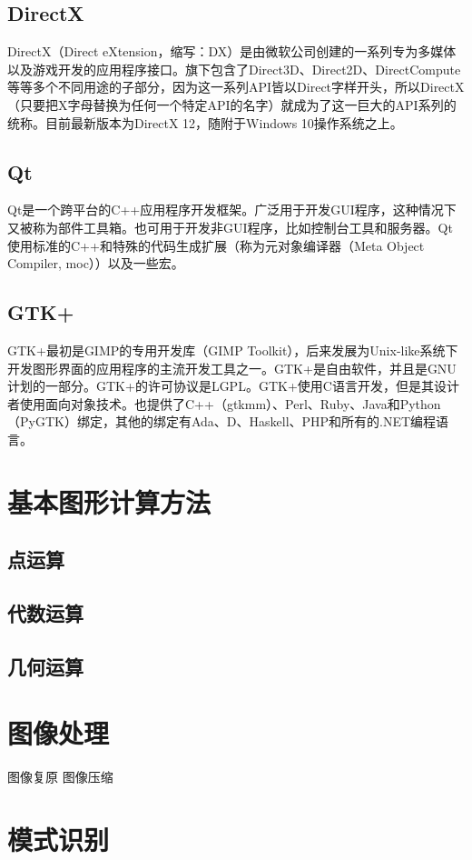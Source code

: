 \documentclass[UTF8]{article}
\begin{document}
\subsection{DirectX}
DirectX（Direct eXtension，缩写：DX）是由微软公司创建的一系列专为多媒体以及游戏开发的应用程序接口。旗下包含了Direct3D、Direct2D、DirectCompute等等多个不同用途的子部分，因为这一系列API皆以Direct字样开头，所以DirectX（只要把X字母替换为任何一个特定API的名字）就成为了这一巨大的API系列的统称。目前最新版本为DirectX 12，随附于Windows 10操作系统之上。

\subsection{Qt}
Qt是一个跨平台的C++应用程序开发框架。广泛用于开发GUI程序，这种情况下又被称为部件工具箱。也可用于开发非GUI程序，比如控制台工具和服务器。Qt使用标准的C++和特殊的代码生成扩展（称为元对象编译器（Meta Object Compiler, moc））以及一些宏。
\subsection{GTK+}
GTK+最初是GIMP的专用开发库（GIMP Toolkit），后来发展为Unix-like系统下开发图形界面的应用程序的主流开发工具之一。GTK+是自由软件，并且是GNU计划的一部分。GTK+的许可协议是LGPL。GTK+使用C语言开发，但是其设计者使用面向对象技术。也提供了C++（gtkmm）、Perl、Ruby、Java和Python（PyGTK）绑定，其他的绑定有Ada、D、Haskell、PHP和所有的.NET编程语言。


\section{基本图形计算方法}
\subsection{点运算}
\subsection{代数运算}
\subsection{几何运算}



\section{图像处理}
图像复原
图像压缩

\section{模式识别}
\end{document}
